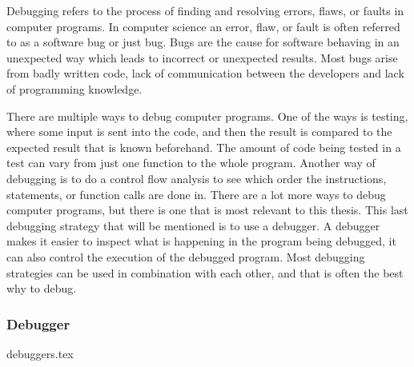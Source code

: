  

Debugging refers to the process of finding and resolving errors, flaws, or faults in computer programs.
In computer science an error, flaw, or fault is often referred to as a software bug or just bug.
Bugs are the cause for software behaving in an unexpected way which leads to incorrect or unexpected results.
Most bugs arise from badly written code, lack of communication between the developers and lack of programming knowledge.


There are multiple ways to debug computer programs.
One of the ways is testing, where some input is sent into the code, and then the result is compared to the expected result that is known beforehand.
The amount of code being tested in a test can vary from just one function to the whole program.
Another way of debugging is to do a control flow analysis to see which order the instructions, statements, or function calls are done in.
There are a lot more ways to debug computer programs, but there is one that is most relevant to this thesis.
This last debugging strategy that will be mentioned is to use a debugger.
A debugger makes it easier to inspect what is happening in the program being debugged, it can also control the execution of the debugged program.
Most debugging strategies can be used in combination with each other, and that is often the best why to debug.



\subsubsection{Debugger}
{debuggers.tex}

